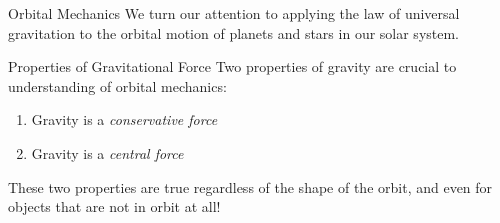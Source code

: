 \documentclass[12pt,compress,aspectratio=169]{beamer}
\begin{document}
\begin{frame}{Orbital Mechanics}
  We turn our attention to applying the law of universal gravitation to the
  orbital motion of planets and stars in our solar system.
\end{frame}





\begin{frame}{Properties of Gravitational Force}
  Two properties of gravity are crucial to understanding of orbital mechanics:
  \begin{enumerate}
  \item Gravity is a \emph{conservative force}
  \item Gravity is a \emph{central force}
   \end{enumerate}
  These two properties are true regardless of the shape of the orbit, and even
  for objects that are not in orbit at all! 
\end{frame}
\end{document}
